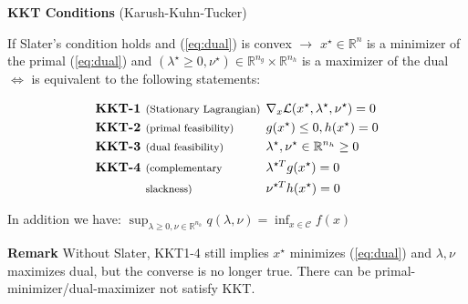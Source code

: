 \begin{sstTitleBox}[BrickRed]{\textbf{\large
			KKT  Conditions}
		\normalsize(Karush-Kuhn-Tucker)}
	\begin{theorem}
		\begin{centering}
			If Slater's condition holds and
			(\ref{eq:dual}) is convex
			$\rightarrow$
			$x^\star \in \mathbb{R}^{n}$ is a minimizer of the primal (\ref{eq:dual})
			and $(\lambda^\star\ge0,\nu^\star)\in\mathbb{R}^{n_g}\times\mathbb{R}^{n_h}$
			is a maximizer of the dual $\Leftrightarrow$
			is equivalent to the following statements:
			\begin{sstFullFrame}[BrickRed]
				\vspace{-3mm}
				\color{white}
				\small
				\[\begin{aligned}
						\textbf{KKT-1 } & \text{\footnotesize (Stationary Lagrangian)} \hspace{-2mm} &  & \nabla_x\mathcal{L}(x^\star,\lambda^\star,\nu^\star)  =  0
						\\
						\textbf{KKT-2 } & \text{\footnotesize (primal feasibility)}                  &  & g(x^\star)\le0, h(x^\star)                            =                            0
						\\
						\textbf{KKT-3 } & \text{\footnotesize (dual feasibility)}                    &  & \lambda^\star  , \nu^\star \in \mathbb{R}^{n_h}       \ge       0
						\\
						\textbf{KKT-4 } & \text{\footnotesize (complementary}                        &  & \lambda^{\star T} g(x^\star)                          =                          0
						\\
						                & \text{\footnotesize slackness)}                            &  & \nu^{\star T} h(x^\star)                              =  0
					\end{aligned}\]
				\vspace{-4mm}
			\end{sstFullFrame}
			In addition we have:
			$\sup_{\lambda\ge0,\nu\in\mathbb{R}^{n_h}}q(\lambda,\nu)=\inf_{x\in\mathcal{C}}f(x)$
		\end{centering}
	\end{theorem}
\end{sstTitleBox}

\textbf{Remark} Without Slater,
KKT1-4 still implies $x^\star$ minimizes (\ref{eq:dual})
and $\lambda,\nu$ maximizes dual,
but the converse is no longer true.
There can be primal-minimizer/dual-maximizer not satisfy KKT.

